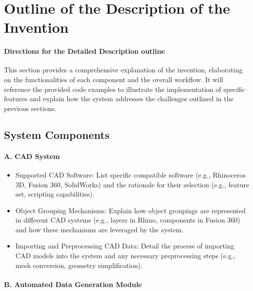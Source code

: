 \documentclass{article}
\begin{document}
\section{Outline of the Description of the Invention}

\paragraph{Directions for the Detailed Description outline}

This section provides a comprehensive explanation of the invention, elaborating on the functionalities of each component and the overall workflow.  It will reference the provided code examples to illustrate the implementation of specific features and explain how the system addresses the challenges outlined in the previous sections.

\subsection{System Components}
\paragraph{A. CAD System}  
\begin{itemize}
    \item Supported CAD Software:  List specific compatible software (e.g., Rhinoceros 3D, Fusion 360, SolidWorks) and the rationale for their selection (e.g., feature set, scripting capabilities).
    \item Object Grouping Mechanisms: Explain how object groupings are represented in different CAD systems (e.g., layers in Rhino, components in Fusion 360) and how these mechanisms are leveraged by the system.
    \item Importing and Preprocessing CAD Data: Detail the process of importing CAD models into the system and any necessary preprocessing steps (e.g., mesh conversion, geometry simplification).
\end{itemize}
\paragraph{B. Automated Data Generation Module}
\end{document}
